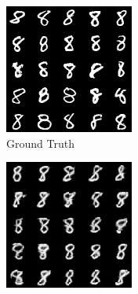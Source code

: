 \begin{figure}[H]
    \centering
    \begin{subfigure}[b]{0.24\textwidth}
        \centering
        \includegraphics[width=\textwidth]{figures/einsum/8mnist_ground_truth.png}
        \caption{Ground Truth}
    \end{subfigure}
    \begin{subfigure}[b]{0.24\textwidth}
        \centering
        \includegraphics[width=\textwidth]{figures/einsum/8mnist_EM.png}

\end{subfigure}
\end{figure}

